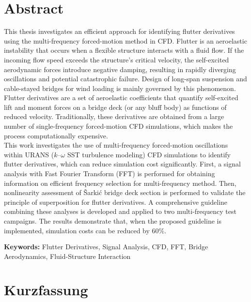 \chapter*{Abstract}
\thispagestyle{empty}

This thesis investigates an efficient approach for identifying flutter derivatives using the 
multi-frequency forced-motion method in CFD. Flutter is an aeroelastic instability that occurs 
when a flexible structure interacts with a fluid flow. If the incoming flow speed exceeds the 
structure's critical velocity, the self-excited aerodynamic forces introduce negative damping, resulting in 
rapidly diverging oscillations and potential catastrophic failure. Design of long-span suspension and 
cable-stayed bridges for wind loading is mainly governed by this phenomenon. \\

Flutter derivatives are a set of aeroelastic coefficients that quantify self-excited lift and 
moment forces on a bridge deck (or any bluff body) as functions of reduced velocity. Traditionally, these derivatives 
are obtained from a large number of single-frequency forced-motion CFD simulations, which makes the process computationally expensive. \\

This work investigates the use of multi-frequency forced-motion oscillations within URANS ($k$--$\omega$ SST turbulence modeling) 
CFD simulations to identify flutter derivatives, which can reduce 
simulation cost significantly. First, a signal analysis with Fast Fourier Transform (FFT) is 
performed for obtaining information on efficient frequency selection for multi-frequency method.
Then, nonlinearity assessment of \v{S}arki\'c bridge deck section is performed to validate the principle of 
superposition for flutter derivatives. A comprehensive guideline combining these analyses is 
developed and applied to two multi-frequency test campaigns. The results demonstrate that, 
when the proposed guideline is implemented, simulation costs can be reduced by 60\%. \\

\vspace{0.5cm}

\noindent\textbf{Keywords:} 
Flutter Derivatives, Signal Analysis, CFD, FFT, Bridge Aerodynamics, Fluid-Structure Interaction


\chapter*{Kurzfassung}
\thispagestyle{empty}

